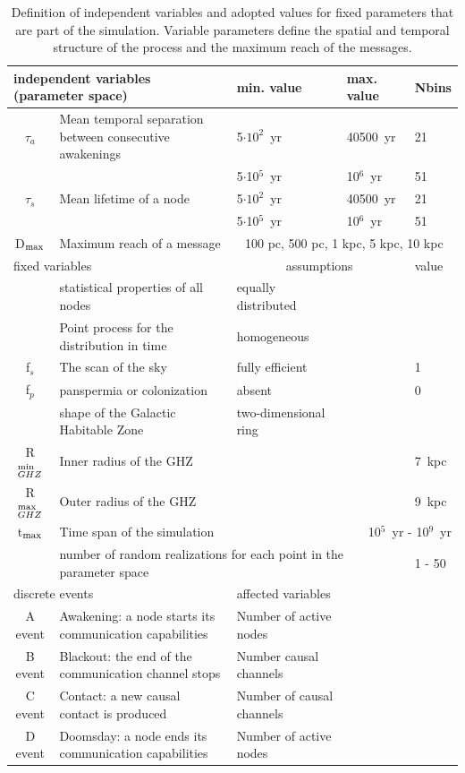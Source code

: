 \documentclass[crop]{CSLB}
\newcommand{\ceti}{node}
\newcommand{\cetis}{nodes}
\begin{document}
 \setlength{\tabcolsep}{10pt}
\begin{table}
\centering
\begin{tabular}{cllll}
\hline
   \multicolumn{2}{l}{independent variables (parameter space)}
   &min. value&max. value&Nbins\\
\hline
   $\tau_{a}$ & Mean temporal separation between consecutive awakenings 
	      & 5$\cdot10^2$~yr & 40500~yr & 21\\ 
	    & & 5$\cdot$10$^5$~yr & 10$^6$~yr & 51\\ 
   $\tau_{s}$ & Mean lifetime of a \ceti{}
	      & 5$\cdot10^2$~yr & 40500~yr & 21\\ 
	    & & 5$\cdot$10$^5$~yr & 10$^6$~yr & 51\\ 
	D$_{\rm max}$ & Maximum reach of a message  & \multicolumn{3}{c}{100 pc, 500 pc, 1 kpc, 5 kpc, 10 kpc} \\
\hline
   \multicolumn{2}{l}{fixed variables} & \multicolumn{2}{c}{assumptions} &value \\
\hline
   & statistical properties of all \cetis{} &equally distributed&&\\
   & Point process for the distribution in time & homogeneous &&\\
   f$_s$ & The scan of the sky & fully efficient&&1\\
   f$_p$ & panspermia or colonization &absent&&0\\
   & shape of the Galactic Habitable Zone & two-dimensional ring &&\\
	R$_{GHZ}^{\rm min}$   & Inner radius of the GHZ  & \citet{lineweaver_galactic_2004} & & 7~kpc\\
   R$_{GHZ}^{\rm max}$   & Outer radius of the GHZ       & \citet{lineweaver_galactic_2004} & & 9~kpc\\
	t$_{\rm max}$ & Time span of the simulation  & &
   \multicolumn{2}{r}{10$^5$~yr - 10$^9$~yr} \\
    & \multicolumn{3}{l}{number of random realizations for each point
    in the parameter space} & 1 - 50 \\
\hline
   \multicolumn{2}{l}{discrete events} &
   \multicolumn{3}{l}{affected variables}\\
\hline
   A event & Awakening: a \ceti{} starts its communication
   capabilities &Number of active \cetis{}\\
   B event & Blackout: the end of the communication channel stops
   &Number causal channels\\
   C event & Contact: a new causal contact is produced &Number of causal channels\\
   D event & Doomsday: a \ceti{} ends its communication capabilities&Number of active \cetis{}\\
\hline

\hline
\end{tabular}
\caption{Definition of independent variables and adopted values for 
   fixed parameters 
   that are part of the simulation.  Variable parameters define the
   spatial and temporal structure
   of the process and the maximum reach of the messages.}
\label{T_simu_hypotheses}
\end{table}
 
\end{document}
